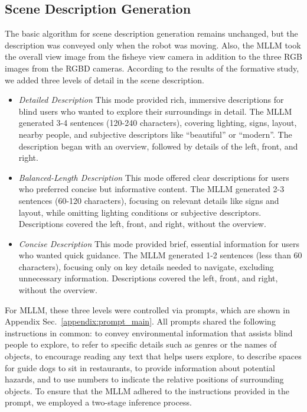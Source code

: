 \subsection{Scene Description Generation}
\label{sec:Implementation_description_mode}
The basic algorithm for scene description generation remains unchanged, but the description was conveyed only when the robot was moving.
Also, the MLLM took the overall view image from the fisheye view camera in addition to the three RGB images from the RGBD cameras.
According to the results of the formative study, we added three levels of detail in the scene description.
\begin{itemize}
    \item{\textit{Detailed Description}}
    This mode provided rich, immersive descriptions for blind users who wanted to explore their surroundings in detail. 
    The MLLM generated 3-4 sentences (120-240 characters), covering lighting, signs, layout, nearby people, and subjective descriptors like ``beautiful'' or ``modern''. 
    The description began with an overview, followed by details of the left, front, and right.
    \item{\textit{Balanced-Length Description}}
    This mode offered clear descriptions for users who preferred concise but informative content. 
    The MLLM generated 2-3 sentences (60-120 characters), focusing on relevant details like signs and layout, while omitting lighting conditions or subjective descriptors. 
    Descriptions covered the left, front, and right, without the overview.
    \item{\textit{Concise Description}}
    This mode provided brief, essential information for users who wanted quick guidance. 
    The MLLM generated 1-2 sentences (less than 60 characters), focusing only on key details needed to navigate, excluding unnecessary information. 
    Descriptions covered the left, front, and right, without the overview.
\end{itemize}
For MLLM, these three levels were controlled via prompts, which are shown in Appendix Sec.~\ref{appendix:prompt_main}.
All prompts shared the following instructions in common: to convey environmental information that assists blind people to explore, to refer to specific details such as genres or the names of objects, to encourage reading any text that helps users explore, to describe spaces for guide dogs to sit in restaurants, to provide information about potential hazards, and to use numbers to indicate the relative positions of surrounding objects.
To ensure that the MLLM adhered to the instructions provided in the prompt, we employed a two-stage inference process. 
